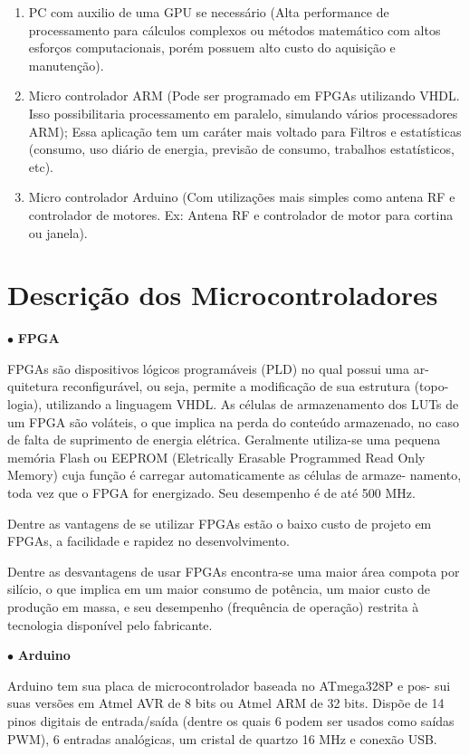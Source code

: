 \begin{enumerate}
	\item PC com auxilio de uma GPU se necessário (Alta performance de processamento para cálculos complexos ou métodos matemático com altos esforços computacionais, porém possuem alto custo do aquisição e manutenção).
	\item Micro controlador ARM (Pode ser programado em FPGAs utilizando VHDL. Isso possibilitaria processamento em paralelo, simulando vários processadores ARM); Essa aplicação tem um caráter mais voltado para Filtros e estatísticas (consumo, uso diário de energia, previsão de consumo, trabalhos estatísticos, etc).
	\item Micro controlador Arduino (Com utilizações mais simples como antena RF e controlador de motores. Ex: Antena RF e controlador de motor para cortina ou janela).
\end{enumerate}

\section{Descrição dos Microcontroladores}

$\bullet$ \textbf{FPGA}

	FPGAs são dispositivos lógicos programáveis (PLD) no qual possui uma ar- quitetura reconfigurável, ou seja, permite a modificação de sua estrutura (topo- logia), utilizando a linguagem VHDL. As células de armazenamento dos LUTs de um FPGA são voláteis, o que implica na perda do conteúdo armazenado, no caso de falta de suprimento de energia elétrica. Geralmente utiliza-se uma pequena memória Flash ou EEPROM (Eletrically Erasable Programmed Read Only Memory) cuja função é carregar automaticamente as células de armaze- namento, toda vez que o FPGA for energizado. Seu desempenho é de até 500 MHz.

	Dentre as vantagens de se utilizar FPGAs estão o baixo custo de projeto em FPGAs, a facilidade e rapidez no desenvolvimento.

	Dentre as desvantagens de usar FPGAs encontra-se uma maior área compota por silício, o que implica em um maior consumo de potência, um maior custo de produção em massa, e seu desempenho (frequência de operação) restrita à tecnologia disponível pelo fabricante.

$\bullet$ \textbf{Arduino}

	Arduino tem sua placa de microcontrolador baseada no ATmega328P e pos- sui suas versões em Atmel AVR de 8 bits ou Atmel ARM de 32 bits. Dispõe de 14 pinos digitais de entrada/saída (dentre os quais 6 podem ser usados como saídas PWM), 6 entradas analógicas, um cristal de quartzo 16 MHz e conexão USB.

